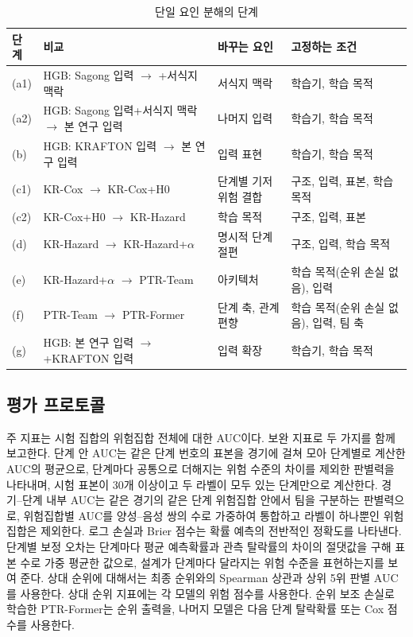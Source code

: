 \begin{table}[t]
\centering
\caption{단일 요인 분해의 단계}
\label{tab:ladder}
\small
\begin{tabular}{p{0.5cm}p{2.9cm}p{1.9cm}p{1.9cm}}
\hline
단계 & 비교 & 바꾸는 요인 & 고정하는 조건 \\
\hline
(a1) & HGB: Sagong 입력 $\rightarrow$ +서식지 맥락 & 서식지 맥락 & 학습기, 학습 목적 \\
(a2) & HGB: Sagong 입력+서식지 맥락 $\rightarrow$ 본 연구 입력 & 나머지 입력 & 학습기, 학습 목적 \\
(b) & HGB: KRAFTON 입력 $\rightarrow$ 본 연구 입력 & 입력 표현 & 학습기, 학습 목적 \\
(c1) & KR-Cox $\rightarrow$ KR-Cox+H0 & 단계별 기저위험 결합 & 구조, 입력, 표본, 학습 목적 \\
(c2) & KR-Cox+H0 $\rightarrow$ KR-Hazard & 학습 목적 & 구조, 입력, 표본 \\
(d) & KR-Hazard $\rightarrow$ KR-Hazard+$\alpha$ & 명시적 단계 절편 & 구조, 입력, 학습 목적 \\
(e) & KR-Hazard+$\alpha$ $\rightarrow$ PTR-Team & 아키텍처 & 학습 목적(순위 손실 없음), 입력 \\
(f) & PTR-Team $\rightarrow$ PTR-Former & 단계 축, 관계 편향 & 학습 목적(순위 손실 없음), 입력, 팀 축 \\
(g) & HGB: 본 연구 입력 $\rightarrow$ +KRAFTON 입력 & 입력 확장 & 학습기, 학습 목적 \\
\hline
\end{tabular}
\end{table}

\subsection{평가 프로토콜}
\label{sec:method:evaluation}

주 지표는 시험 집합의 위험집합 전체에 대한 AUC이다.
보완 지표로 두 가지를 함께 보고한다.
단계 안 AUC는 같은 단계 번호의 표본을 경기에 걸쳐 모아 단계별로 계산한 AUC의 평균으로, 단계마다 공통으로 더해지는 위험 수준의 차이를 제외한 판별력을 나타내며, 시험 표본이 30개 이상이고 두 라벨이 모두 있는 단계만으로 계산한다.
경기--단계 내부 AUC는 같은 경기의 같은 단계 위험집합 안에서 팀을 구분하는 판별력으로, 위험집합별 AUC를 양성--음성 쌍의 수로 가중하여 통합하고 라벨이 하나뿐인 위험집합은 제외한다.
로그 손실과 Brier 점수는 확률 예측의 전반적인 정확도를 나타낸다.
단계별 보정 오차는 단계마다 평균 예측확률과 관측 탈락률의 차이의 절댓값을 구해 표본 수로 가중 평균한 값으로, 설계가 단계마다 달라지는 위험 수준을 표현하는지를 보여 준다.
상대 순위에 대해서는 최종 순위와의 Spearman 상관과 상위 5위 판별 AUC를 사용한다.
상대 순위 지표에는 각 모델의 위험 점수를 사용한다. 순위 보조 손실로 학습한 PTR-Former는 순위 출력을, 나머지 모델은 다음 단계 탈락확률 또는 Cox 점수를 사용한다.

